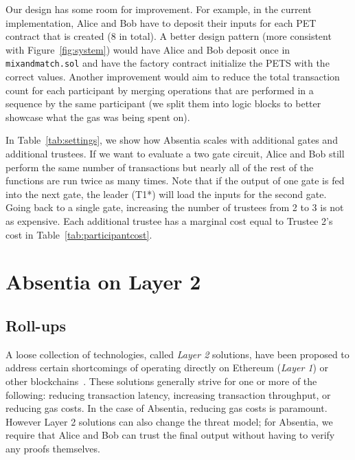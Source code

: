Our design has some room for improvement. For example, in the current implementation, Alice and Bob have to deposit their inputs for each PET contract that is created (8 in total). A better design pattern (more consistent with Figure~\ref{fig:system}) would have Alice and Bob deposit once in \texttt{mixandmatch.sol} and have the factory contract initialize the PETS with the correct values. Another improvement would aim to reduce the total transaction count for each participant by merging operations that are performed in a sequence by the same participant (we split them into logic blocks to better showcase what the gas was being spent on). 

In Table~\ref{tab:settings}, we show how Absentia scales with additional gates and additional trustees. If we want to evaluate a two gate circuit, Alice and Bob still perform the same number of transactions but nearly all of the rest of the functions are run twice as many times. Note that if the output of one gate is fed into the next gate, the leader (T1*) will load the inputs for the second gate. Going back to a single gate, increasing the number of trustees from 2 to 3 is not as expensive. Each additional trustee has a marginal cost equal to Trustee 2's cost in Table~\ref{tab:participantcost}.


\section{Absentia on Layer 2 }
\label{sec:arb}

\subsection{Roll-ups}

A loose collection of technologies, called \emph{Layer 2} solutions, have been proposed to address certain shortcomings of operating directly on Ethereum (\emph{Layer 1}) or other blockchains~\cite{GMR+20}. These solutions generally strive for one or more of the following: reducing transaction latency, increasing transaction throughput, or reducing gas costs. In the case of Absentia, reducing gas costs is paramount. However Layer 2 solutions can also change the threat model; for Absentia, we require that Alice and Bob can trust the final output without having to verify any proofs themselves. 

